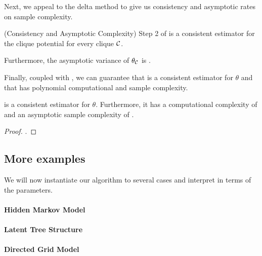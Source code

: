 Next, we appeal to the delta method to give us
  consistency and asymptotic rates on sample complexity.
\begin{corollary}(Consistency and Asymptotic Complexity)
  \label{cor:asymptotics}
  Step 2 of  is a consistent estimator for
  the clique potential for every clique $\mathcal{C}$.

  Furthermore, the asymptotic variance of $\theta_{\mathcal{C}}$ is
  .
\end{corollary}

Finally, coupled with , we can guarantee that
   is a consistent estimator for $\theta$ and 
  that has polynomial computational and sample complexity.
\begin{theorem}
   is a consistent estimator for $\theta$.
  Furthermore, it has a computational complexity of  and an
    asymptotic sample complexity of .
\end{theorem}
\begin{proof}
  .
\end{proof}

\subsection{More examples}

We will now instantiate our algorithm to several cases and interpret
 in terms of the parameters.

\paragraph{Hidden Markov Model}

\paragraph{Latent Tree Structure}

\paragraph{Directed Grid Model}

